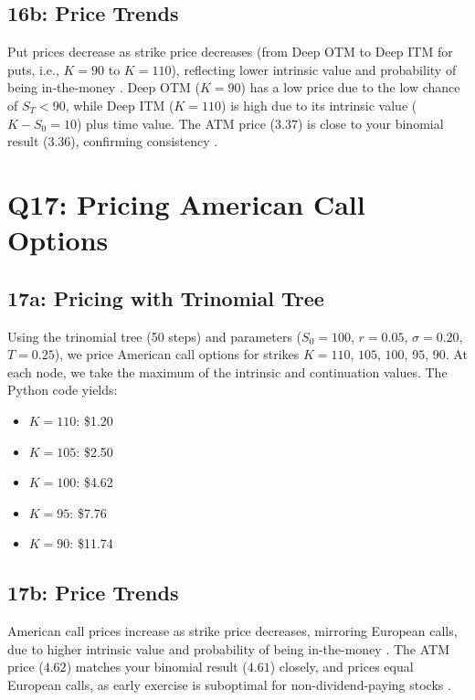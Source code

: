 \documentclass{article}
\begin{document}
\subsection*{16b: Price Trends}

Put prices decrease as strike price decreases (from Deep OTM to Deep ITM for puts, i.e., $K=90$ to $K=110$), reflecting lower intrinsic value and probability of being in-the-money \citep{hull2018options}. Deep OTM ($K=90$) has a low price due to the low chance of $S_T < 90$, while Deep ITM ($K=110$) is high due to its intrinsic value ($K - S_0 = 10$) plus time value. The ATM price ($3.37$) is close to your binomial result ($3.36$), confirming consistency \citep{shreve2004stochastic}.

\section*{Q17: Pricing American Call Options}

\subsection*{17a: Pricing with Trinomial Tree}

Using the trinomial tree (50 steps) and parameters ($S_0 = 100$, $r = 0.05$, $\sigma = 0.20$, $T = 0.25$), we price American call options for strikes $K=110$, $105$, $100$, $95$, $90$. At each node, we take the maximum of the intrinsic and continuation values. The Python code yields:

\begin{itemize}
    \item $K=110$: \$1.20
    \item $K=105$: \$2.50
    \item $K=100$: \$4.62
    \item $K=95$: \$7.76
    \item $K=90$: \$11.74
\end{itemize}

\subsection*{17b: Price Trends}

American call prices increase as strike price decreases, mirroring European calls, due to higher intrinsic value and probability of being in-the-money \citep{hull2018options}. The ATM price ($4.62$) matches your binomial result ($4.61$) closely, and prices equal European calls, as early exercise is suboptimal for non-dividend-paying stocks \citep{shreve2004stochastic}.
\end{document}
